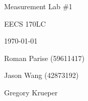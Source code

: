 \centering
\vspace*{5cm}
{\huge Measurement Lab \#1 \par}
{\Large EECS 170LC \par}
{\Large \today \par}
\vspace{1cm}
{\large Roman Parise (59611417) \par}
{\large Jason Wang (42873192) \par}
{\large Gregory Krueper \par}
\vspace{1cm}

